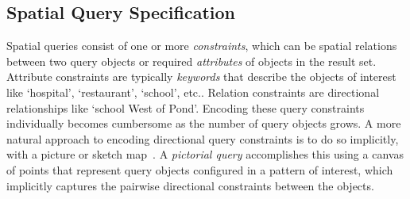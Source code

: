 \subsection{Spatial Query Specification}
\par{
    Spatial queries consist of one or more \textit{constraints}, which can be spatial relations between two query objects or required \textit{attributes} of objects in the result set.
    Attribute constraints are typically \textit{keywords} that describe the objects of interest like `hospital', `restaurant', `school', etc..
    Relation constraints are directional relationships like `school West of Pond'.
    Encoding these query constraints individually becomes cumbersome as the number of query objects grows.
    A more natural approach to encoding directional query constraints is to do so implicitly, with a picture or sketch map~\cite{Osul2023}.
    A \textit{pictorial query} accomplishes this using a canvas of points that represent query objects configured in a pattern of interest, which implicitly captures the pairwise directional constraints between the objects. 
}


